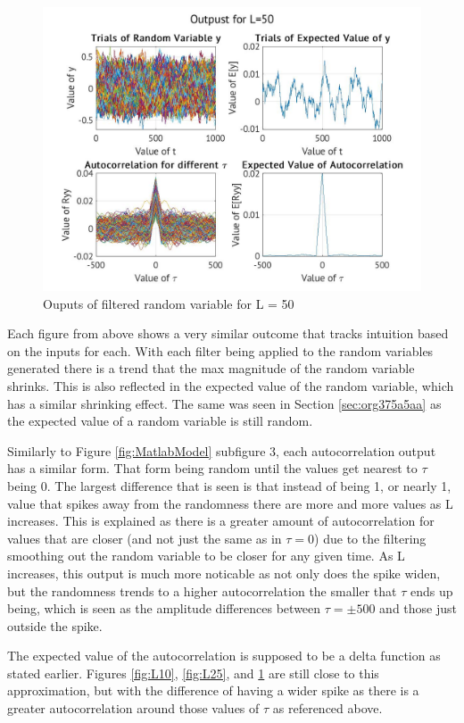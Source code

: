 \documentclass[a4paper, 11pt]{article}
\begin{document}
\begin{figure}[htbp]
\centering
\includegraphics[width=.9\linewidth]{./Images/L50.jpg}
\caption{\label{fig:L50}Ouputs of filtered random variable for L = 50}
\end{figure}

\pagebreak
Each figure from above shows a very similar outcome that tracks intuition based on the inputs for each.
With each filter being applied to the random variables generated there is a trend that the max magnitude of the random variable shrinks. This is also reflected in the expected value of the random variable, which has a similar shrinking effect. The same was seen in Section \ref{sec:org375a5aa} as the expected value of a random variable is still random.

Similarly to Figure \ref{fig:MatlabModel} subfigure 3, each autocorrelation output has a similar form. That form being random until the values get nearest to \(\tau\) being 0. The largest difference that is seen is that instead of being 1, or nearly 1, value that spikes away from the randomness there are more and more values as L increases. This is explained as there is a greater amount of autocorrelation for values that are closer (and not just the same as in \(\tau = 0\)) due to the filtering smoothing out the random variable to be closer for any given time. As L increases, this output is much more noticable as not only does the spike widen, but the randomness trends to a higher autocorrelation the smaller that \(\tau\) ends up being, which is seen as the amplitude differences between \(\tau = \pm 500\) and those just outside the spike.

The expected value of the autocorrelation is supposed to be a delta function as stated earlier. Figures \ref{fig:L10}, \ref{fig:L25}, and \ref{fig:L50} are still close to this approximation, but with the difference of having a wider spike as there is a greater autocorrelation around those values of \(\tau\) as referenced above.
\end{document}
